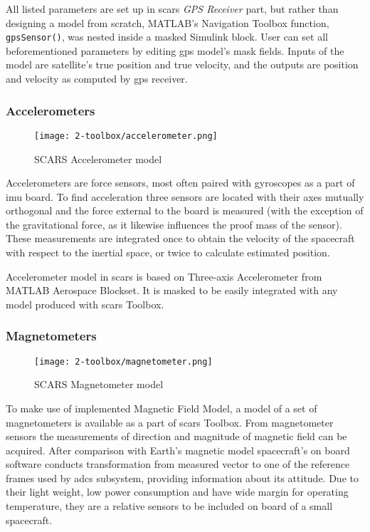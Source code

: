         All listed parameters are set up in \ac{scars} \textit{GPS Receiver} part, but rather than designing a model from scratch, MATLAB's Navigation Toolbox function, \verb|gpsSensor()|, was nested inside a masked Simulink block. User can set all beforementioned parameters by editing \ac{gps} model's mask fields. Inputs of the model are satellite's true position and true velocity, and the outputs are position and velocity as computed by \ac{gps} receiver.


    \subsubsection{Accelerometers}
        \begin{figure}[H]
            \centering
            \texttt{[image: 2-toolbox/accelerometer.png]}
            \caption{SCARS Accelerometer model}
            \label{fig:accelerometer}
        \end{figure}
        Accelerometers are force sensors, most often paired with gyroscopes as a part of \ac{imu} board. To find acceleration three sensors are located with their axes mutually orthogonal and the force external to the board is measured (with the exception of the gravitational force, as it likewise influences the proof mass of the sensor). These measurements are integrated once to obtain the velocity of the spacecraft with respect to the inertial space, or twice to calculate estimated position.

        Accelerometer model in \ac{scars} is based on Three-axis Accelerometer from MATLAB Aerospace Blockset. It is masked to be easily integrated with any model produced with \ac{scars} Toolbox.



    \subsubsection{Magnetometers}
        \begin{figure}[H]
            \centering
            \texttt{[image: 2-toolbox/magnetometer.png]}
            \caption{SCARS Magnetometer model}
            \label{fig:magnetometer}
        \end{figure}

        To make use of implemented Magnetic Field Model, a model of a set of magnetometers is available as a part of \ac{scars} Toolbox. From magnetometer sensors the measurements of direction and magnitude of magnetic field can be acquired. After comparison with Earth's magnetic model spacecraft's on board software conducts transformation from measured vector to one of the reference frames used by \ac{adcs} subsystem, providing information about its attitude. Due to their light weight, low power consumption and have wide margin for operating temperature, they are a relative sensors to be included on board of a small spacecraft.

